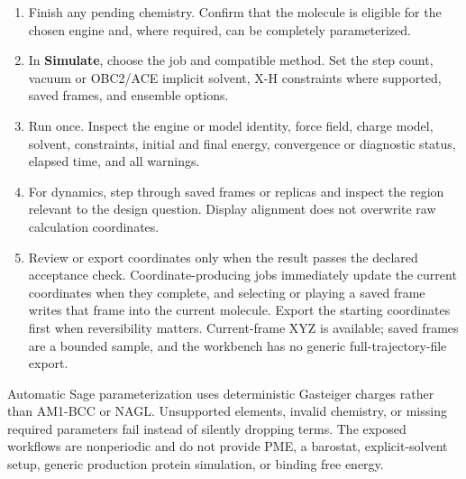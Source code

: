 \documentclass[11pt]{article}
\begin{document}
\begin{enumerate}
\item Finish any pending chemistry. Confirm that the molecule is eligible for the chosen engine and, where required, can be completely parameterized.
\item In \textbf{Simulate}, choose the job and compatible method. Set the step count, vacuum or OBC2/ACE implicit solvent, X-H constraints where supported, saved frames, and ensemble options.
\item Run once. Inspect the engine or model identity, force field, charge model, solvent, constraints, initial and final energy, convergence or diagnostic status, elapsed time, and all warnings.
\item For dynamics, step through saved frames or replicas and inspect the region relevant to the design question. Display alignment does not overwrite raw calculation coordinates.
\item Review or export coordinates only when the result passes the declared acceptance check. Coordinate-producing jobs immediately update the current coordinates when they complete, and selecting or playing a saved frame writes that frame into the current molecule. Export the starting coordinates first when reversibility matters. Current-frame XYZ is available; saved frames are a bounded sample, and the workbench has no generic full-trajectory-file export.
\end{enumerate}


Automatic Sage parameterization uses deterministic Gasteiger charges rather than AM1-BCC or NAGL. Unsupported elements, invalid chemistry, or missing required parameters fail instead of silently dropping terms. The exposed workflows are nonperiodic and do not provide PME, a barostat, explicit-solvent setup, generic production protein simulation, or binding free energy.
\end{document}
